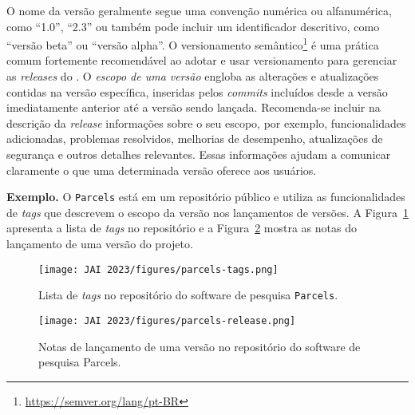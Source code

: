 O nome da versão geralmente segue uma convenção numérica ou alfanumérica, como ``1.0'', ``2.3'' ou também pode incluir um identificador descritivo, como ``versão beta'' ou ``versão alpha''. 
O versionamento semântico\footnote{\url{https://semver.org/lang/pt-BR}} é uma prática comum fortemente recomendável ao adotar e usar versionamento para gerenciar as \textit{releases} do \RS.
%
O \textit{escopo de uma versão} engloba as alterações e atualizações contidas na versão específica, inseridas pelos \textit{commits} incluídos desde a versão imediatamente anterior até a versão sendo lançada. 
Recomenda-se incluir na descrição da \textit{release} informações sobre o seu escopo, por exemplo, funcionalidades adicionadas, problemas resolvidos, melhorias de desempenho, atualizações de segurança e outros detalhes relevantes. Essas informações ajudam a comunicar claramente o que uma determinada versão oferece aos usuários.

\noindent\textbf{Exemplo.}
O \RSw \texttt{Parcels} está em um repositório público e utiliza as funcionalidades de \textit{tags} que descrevem o escopo da versão nos lançamentos de versões.
A Figura~\ref{fig:tags:parcels} apresenta a lista de \textit{tags} no repositório e a Figura~\ref{fig:release:parcels} mostra as notas do lançamento de uma versão do projeto.

\begin{figure}[tbp]
    \centering
    \texttt{[image: JAI 2023/figures/parcels-tags.png]}
    \caption{Lista de \textit{tags} no repositório do software de pesquisa \texttt{Parcels}.}
    \label{fig:tags:parcels}
\end{figure}

\begin{figure}[tbp]
    \centering
    \texttt{[image: JAI 2023/figures/parcels-release.png]}
    \caption{Notas de lançamento de uma versão no repositório do software de pesquisa Parcels.}
    \label{fig:release:parcels}
\end{figure}


\begin{comment}
\subsection{Aspectos de Comunidade}

\textit{Quero usuários:} Release your software; Provide user documentation; Easy installation; Provide issue tracker.

\textit{Quero contribuidores:} 
Provide development documentation; Provide a means of communication; Implement and add a code of conduct; 
Contribution guideline.

\end{comment}

